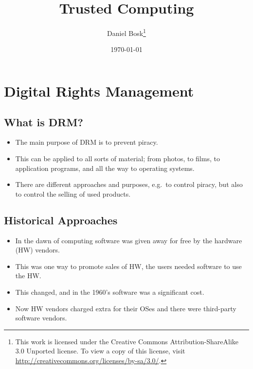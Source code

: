 \documentclass{beamer}
\title{%
  Trusted Computing
}
\author[D.~Bosk]{Daniel Bosk\footnote{%
  This work is licensed under the Creative Commons Attribution-ShareAlike 3.0 
  Unported license.
	To view a copy of this license, visit 
	\url{http://creativecommons.org/licenses/by-sa/3.0/}.
}}
\institute[MIUN ICS]{%
  Department of Information and Communication Systems,\\
  Mid Sweden University, Sundsvall.
}
\date{\today}
\begin{document}
\begin{frame}
  \titlepage{}
\end{frame}





\section{Digital Rights Management}

\subsection{What is DRM?}

\begin{frame}
  \begin{itemize}
    \item The main purpose of DRM is to prevent piracy.

    \item This can be applied to all sorts of material; from photos, to films, 
      to application programs, and all the way to operating systems.

    \item There are different approaches and purposes, e.g.\ to control piracy, 
      but also to control the selling of used products.

  \end{itemize}
\end{frame}

\subsection{Historical Approaches}

\begin{frame}
  \begin{itemize}
    \item In the dawn of computing software was given away for free by the 
      hardware (HW) vendors.

    \item This was one way to promote sales of HW, the users needed software to 
      use the HW\@.

    \item This changed, and in the 1960's software was a significant cost.

    \item Now HW vendors charged extra for their OSes and there were 
      third-party software vendors.
  \end{itemize}
\end{frame}
\end{document}
